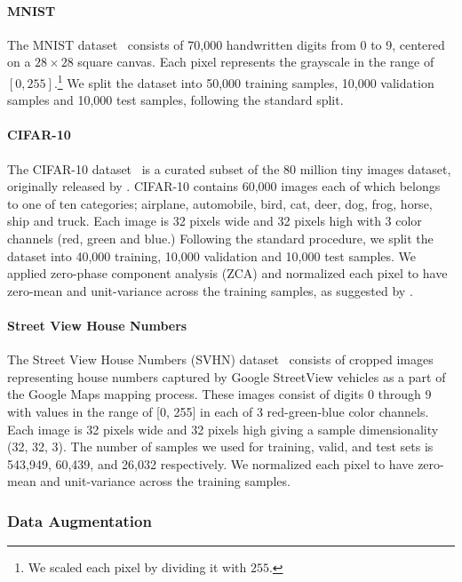 \paragraph{MNIST}
The MNIST dataset~\citep{Lecun99objectrecognition} consists of 70,000
handwritten digits from 0 to 9, centered on a $28\times 28$ square canvas. Each
pixel represents the grayscale in the range of $\left[0, 255\right]$.\footnote{
    We scaled each pixel by dividing it with $255$.
}
We split the dataset into 50,000 training samples, 10,000 validation
samples and 10,000 test samples, following the standard split.

\paragraph{CIFAR-10}
The CIFAR-10 dataset~\citep{KrizhevskyHinton2009} is a curated subset of the 80
million tiny images dataset, originally released by
\citet{Torralba+Fergus+Freeman-2008}. CIFAR-10 contains 60,000 images each of which
belongs to one of ten categories; airplane, automobile, bird, cat, deer, dog,
frog, horse, ship and truck. Each image is 32 pixels wide and 32 pixels high
with 3 color channels (red, green and blue.) Following the standard procedure,
we split the dataset into 40,000 training, 10,000 validation and 10,000 test
samples. We applied zero-phase component analysis (ZCA) and normalized each pixel
to have zero-mean and unit-variance across the training
samples, as suggested by \citet{KrizhevskyHinton2009}.

\paragraph{Street View House Numbers}
The Street View House Numbers (SVHN) dataset~\citep{Netzer-wkshp-2011} consists
of cropped images representing house numbers captured by Google StreetView
vehicles as a part of the Google Maps mapping process. These images consist of
digits 0 through 9 with values in the range of [0, 255] in each of 3
red-green-blue color channels. Each image is 32 pixels wide and 32 pixels
high giving a sample dimensionality (32, 32, 3). The number of samples we used for
training, valid, and test sets is 543,949, 60,439, and 26,032 respectively. We
normalized each pixel to have zero-mean and unit-variance across the training
samples.

\subsubsection{Data Augmentation}

